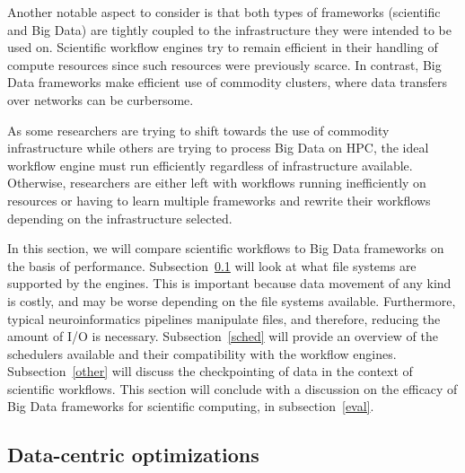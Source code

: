         Another notable aspect to consider is that both types of frameworks
        (scientific and Big Data) are tightly coupled to the infrastructure they
        were intended to be used on. Scientific workflow engines try to remain
        efficient in their handling of compute resources since such resources
        were previously scarce. In contrast, Big Data frameworks make efficient
        use of commodity clusters, where data transfers over networks can be curbersome.

        As some researchers are trying to shift towards the use of commodity
        infrastructure while others are trying to process Big Data on HPC, the
        ideal workflow engine must run efficiently regardless of infrastructure
        available. Otherwise, researchers are either left with workflows running
        inefficiently on resources or having to learn multiple frameworks and
        rewrite their workflows depending on the infrastructure selected.
 
        In this section, we will compare scientific workflows to Big Data
        frameworks on the basis of performance. Subsection~\ref{fs} will look at
        what file systems are supported by the engines. This is important because
        data movement of any kind is costly, and may be worse depending on the
        file systems available. Furthermore, typical neuroinformatics pipelines
        manipulate files, and therefore, reducing the amount of I/O is
        necessary. Subsection~\ref{sched} will provide an overview of the
        schedulers available and their compatibility with the workflow engines.
        Subsection~\ref{other} will discuss the checkpointing of data in the
        context of scientific workflows. This section will conclude with a
        discussion on the efficacy of Big Data frameworks for scientific
        computing, in subsection~\ref{eval}.
        
 
        \subsection{Data-centric optimizations}\label{fs}
            
